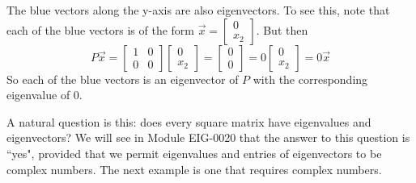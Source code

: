 \documentclass{ximera}
\begin{document}
\begin{example}
\begin{explanation}
\begin{center}
\end{center}

The blue vectors along the y-axis are also eigenvectors.  To see this, note that each of the blue vectors is of the form $\vec{x}=\begin{bmatrix}0\\x_2\end{bmatrix}$.  But then $$P\vec{x}=\begin{bmatrix}1&0\\0&0\end{bmatrix}\begin{bmatrix}0\\x_2\end{bmatrix}=\begin{bmatrix}0\\0\end{bmatrix}=0\begin{bmatrix}0\\x_2\end{bmatrix}=0\vec{x}$$
So each of the blue vectors is an eigenvector of $P$ with the corresponding eigenvalue of $0$.
\end{explanation}
\end{example}

A natural question is this: does every square matrix have eigenvalues and eigenvectors?  We will see in Module EIG-0020 that the answer to this question is ``yes", provided that we permit eigenvalues and entries of eigenvectors to be complex numbers.  The next example is one that requires complex numbers.
\end{document}
